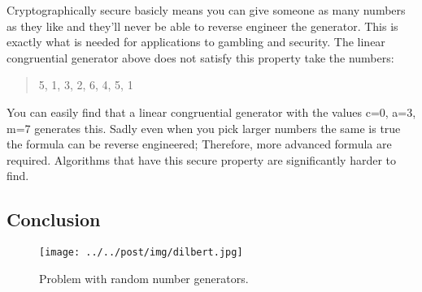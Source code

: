 \documentclass[]{article}
\begin{document}
Cryptographically secure basicly means you can give someone as many
numbers as they like and they'll never be able to reverse engineer the
generator. This is exactly what is needed for applications to gambling
and security. The linear congruential generator above does not satisfy
this property take the numbers:

\begin{quote}
5, 1, 3, 2, 6, 4, 5, 1
\end{quote}

You can easily find that a linear congruential generator with the values
c=0, a=3, m=7 generates this. Sadly even when you pick larger numbers
the same is true the formula can be reverse engineered; Therefore, more
advanced formula are required. Algorithms that have this secure property
are significantly harder to find.

\subsection{Conclusion}\label{conclusion}

\begin{figure}[htbp]
\centering
\texttt{[image: ../../post/img/dilbert.jpg]}
\caption{Problem with random number generators.}
\end{figure}
\end{document}
